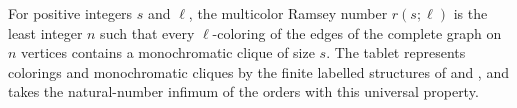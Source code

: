 \begin{definition}
For positive integers $s$ and $\ell$, the multicolor Ramsey number
$r(s;\ell)$ is the least integer $n$ such that every $\ell$-coloring of the
edges of the complete graph on $n$ vertices contains a monochromatic clique of
size $s$.  The tablet represents colorings and monochromatic cliques by the
finite labelled structures of  and
, and takes the natural-number infimum of the
orders with this universal property.
\end{definition}
